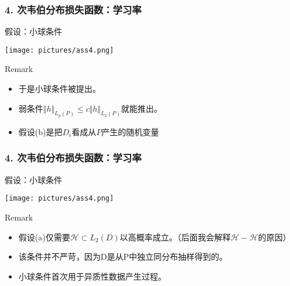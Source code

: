 \documentclass{beamer}
\begin{document}
\begin{frame}
    \frametitle{4. 次韦伯分布损失函数：学习率}
    \begin{block}{假设：小球条件}
        \begin{center}
            \texttt{[image: pictures/ass4.png]}
        \end{center}
    \end{block}
    \begin{alertblock}{Remark}
        \begin{itemize}
            \item 于是小球条件被提出。
            \pause
            \item 弱条件$\Vert h\Vert_{L_{p}(P)}\leq c \Vert h\Vert_{L_{2}(P)}$就能推出。
            \pause
            \item 假设(b)是把$D_{i}$看成从$P$产生的随机变量
        \end{itemize}
    \end{alertblock}
\end{frame}
\begin{frame}
    \frametitle{4. 次韦伯分布损失函数：学习率}
    \begin{block}{假设：小球条件}
        \begin{center}
            \texttt{[image: pictures/ass4.png]}
        \end{center}
    \end{block}
    \begin{alertblock}{Remark}
        \begin{itemize}
            \item 假设(a)仅需要$\mathcal{H}\subset L_{2}(D)$以高概率成立。（后面我会解释$\mathcal{H}-\mathcal{H}$的原因）
            \pause
            \item 该条件并不严苛，因为D是从P中独立同分布抽样得到的。
            \pause
            \item 小球条件首次用于异质性数据产生过程。
        \end{itemize}
    \end{alertblock}
\end{frame}
\end{document}
